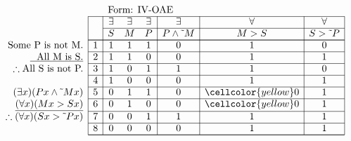 \documentclass[10pt,legalpaper,landscape,cmtt]{article}
\begin{document}
{\begin{minipage}[t]{3.25in}
	\(
	\begin{array}{r|c|ccc|c|c|c|}
		\multicolumn{2}{c}{}&\multicolumn{6}{l}{\mbox{Form: IV-OAE}} \\ \cline{2-8}
		\hspace{1in}	&	& \exists & \exists & \exists & \exists & \forall & \forall\\ \cline{3-8}
		&	& S & M & P &  P \wedge \tilde~M  &  M > S  &  S > \tilde~P \\ \cline{2-8} \cline{2-8}
		\phantom{\therefore}\mbox{Some P is not M.}   & 1 & 1 & 1 & 1 &   0   &   1   &   0  \\ \cline{2-8}
		\underline{\phantom{\therefore}\mbox{All M is S.}}   & 2 & 1 & 1 & 0 &   0   &   1   &   1  \\ \cline{2-8}
		\therefore \mbox{All S is not P.}   & 3 & 1 & 0 & 1 &   1   &   1   &   0  \\ \cline{2-8}
		& 4 & 1 & 0 & 0 &   0   &   1   &   1  \\ \cline{2-8}
		(\exists x)(Px \wedge \tilde~Mx)   & 5 & 0 & 1 & 1 &   0   &   \cellcolor{yellow} 0   &   1  \\ \cline{2-8}
		\underline{(\forall x)(Mx > Sx)}   & 6 & 0 & 1 & 0 &   0   &   \cellcolor{yellow} 0   &   1  \\ \cline{2-8}
		\therefore(\forall x)(Sx > \tilde~Px)   & 7 & 0 & 0 & 1 &   1   &   1   &   1  \\ \cline{2-8}
		& 8 & 0 & 0 & 0 &   0   &   1   &   1   \\ \cline{2-8}\cline{2-8} 
	\end{array}
	\)
\end{minipage}

}
\end{document}
